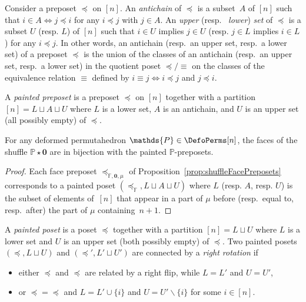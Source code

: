 \documentclass[AHL,Unicode,longabstracts,published]{cedram}
\renewcommand{\b}[1]{\boldsymbol{#1}}
\newcommand{\ssm}{\smallsetminus}
\newcommand{\shuffleDP}{\star} %
\newcommand{\polytope}[1]{\mathds{#1}}
\begin{document}
\begin{defi}\label{def:antichainsLowerUpperSetsPreposets}
Consider a preposet $\preccurlyeq$ on $[n]$. An
\emph{antichain} of $\preccurlyeq$ is a subset~$A$ of $[n]$ such that $i \in A \iff j \preccurlyeq i$ for any $i \preccurlyeq j$ with $j \in A$. An
\emph{upper} (resp.~
\emph{lower})
\emph{set} of $\preccurlyeq$ is a subset $U$ (resp. $L$) of $[n]$ such that $i \in U$ implies $j \in U$ (resp. $j \in L$ implies $i \in L$) for any $i \preccurlyeq j$. In other words, an antichain (resp.~an upper set, resp.~a lower set) of a preposet $\preccurlyeq$ is the union of the classes of an antichain (resp.~an upper set, resp.~a lower set) in the quotient poset $\preccurlyeq/{\equiv}$ on the classes of the equivalence relation $\equiv$ defined by $i \equiv j \iff i \preccurlyeq j$ and $j \preccurlyeq i$.
\end{defi}

\begin{defi}\label{def:paintedPreposet}
A
\emph{painted preposet} is a preposet $\preccurlyeq$ on $[n]$ together with a partition $[n] = L \sqcup A \sqcup U$ where $L$ is a lower set, $A$ is an antichain, and $U$ is an upper set (all possibly empty) of $\preccurlyeq$.
\end{defi}

\begin{prop}\label{prop:paintedPreposets}
For any deformed permutahedron $\polytope{P} \in \DefoPerms[n]$, the faces of the shuffle $\polytope{P} \shuffleDP \b{0}$ are in bijection with the painted $\polytope{P}$-preposets.
\end{prop}

\begin{proof}
Each face preposet $\preccurlyeq_{\polytope{F}, \b{0}, \mu}$ of Proposition~\ref{prop:shuffleFacePreposets} corresponds to a painted poset $(\preccurlyeq_\polytope{F}, L \sqcup A \sqcup U)$ where $L$ (resp. $A$, resp. $U$) is the subset of elements of~$[n]$ that appear in a part of $\mu$ before (resp.~equal to, resp.~after) the part of $\mu$ containing~${n\!+\!1}$.
\end{proof}

\begin{defi}\label{def:paintedPoset}
A
\emph{painted poset} is a poset $\preccurlyeq$ together with a partition \linebreak $[n] = L \sqcup U$ where $L$ is a lower set and $U$ is an upper set (both possibly empty) of $\preccurlyeq$. Two painted posets $(\preccurlyeq, L \sqcup U)$ and $(\preccurlyeq', L' \sqcup U')$ are connected by a
\emph{right rotation} if
\begin{itemize}
\item either $\preccurlyeq$ and $\preccurlyeq$ are related by a right flip, while $L = L'$ and $U = U'$,
\item or ${\preccurlyeq} = {\preccurlyeq}$ and $L = L' \cup \{i\}$ and $U = U' \ssm \{i\}$ for some $i \in [n]$.
\end{itemize}
\end{defi}
\end{document}
